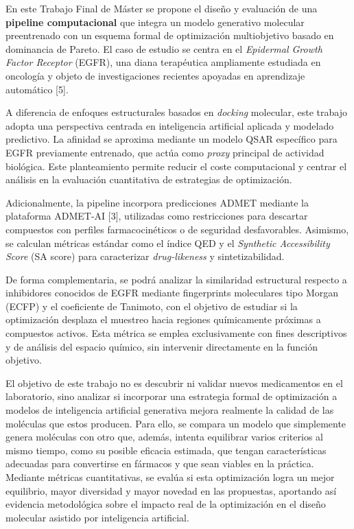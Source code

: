 \documentclass[IB]{TFUOC}%
\begin{document}
En este Trabajo Final de Máster se propone el diseño y evaluación de una \textbf{pipeline
computacional} que integra un modelo generativo molecular preentrenado con un esquema formal
de optimización multiobjetivo basado en dominancia de Pareto. El caso de estudio se centra en el
\textit{Epidermal Growth Factor Receptor} (EGFR), una diana terapéutica ampliamente estudiada
en oncología y objeto de investigaciones recientes apoyadas en aprendizaje automático [5].

A diferencia de enfoques estructurales basados en \textit{docking} molecular, este trabajo adopta
una perspectiva centrada en inteligencia artificial aplicada y modelado predictivo. La afinidad
se aproxima mediante un modelo QSAR específico para EGFR previamente entrenado, que actúa
como \textit{proxy} principal de actividad biológica. Este planteamiento permite reducir el
coste computacional y centrar el análisis en la evaluación cuantitativa de estrategias de
optimización.

Adicionalmente, la pipeline incorpora predicciones ADMET mediante la plataforma ADMET-AI [3],
utilizadas como restricciones para descartar compuestos con perfiles farmacocinéticos o de
seguridad desfavorables. Asimismo, se calculan métricas estándar como el índice QED y el
\textit{Synthetic Accessibility Score} (SA score) para caracterizar \textit{drug-likeness} y
sintetizabilidad.

De forma complementaria, se podrá analizar la similaridad estructural respecto a inhibidores
conocidos de EGFR mediante fingerprints moleculares tipo Morgan (ECFP) y el coeficiente de
Tanimoto, con el objetivo de estudiar si la optimización desplaza el muestreo hacia regiones
químicamente próximas a compuestos activos. Esta métrica se emplea exclusivamente con fines
descriptivos y de análisis del espacio químico, sin intervenir directamente en la función
objetivo.

El objetivo de este trabajo no es descubrir ni validar nuevos medicamentos en el laboratorio, 
sino analizar si incorporar una estrategia formal de optimización a modelos de inteligencia 
artificial generativa mejora realmente la calidad de las moléculas que estos producen. Para ello, 
se compara un modelo que simplemente genera moléculas con otro que, además, intenta equilibrar 
varios criterios al mismo tiempo, como su posible eficacia estimada, que tengan características 
adecuadas para convertirse en fármacos y que sean viables en la práctica. Mediante métricas 
cuantitativas, se evalúa si esta optimización logra un mejor equilibrio, mayor diversidad y 
mayor novedad en las propuestas, aportando así evidencia metodológica sobre el impacto real de 
la optimización en el diseño molecular asistido por inteligencia artificial.
\end{document}
